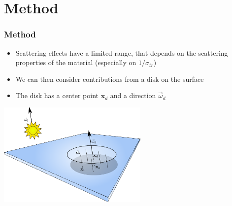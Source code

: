 \documentclass{beamer}
\newcommand{\vomega}{\vec{\omega}}
\newcommand{\x}{\mathbf{x}}
\begin{document}
\section{Method}
\begin{frame}
    \frametitle{Method}
			\begin{itemize}
			\vspace{0.2cm}
			\item Scattering effects have a limited range, that depends on the scattering properties of the material (especially on $1/\sigma_{tr}$)
			\item We can then consider contributions from a disk on the surface
			\item The disk has a center point $\x_d$ and a direction $\vomega_d$
			\end{itemize}
			\centering
			\includegraphics[width=0.55\textwidth]{disk_setup.pdf} 

\end{frame}
\end{document}
